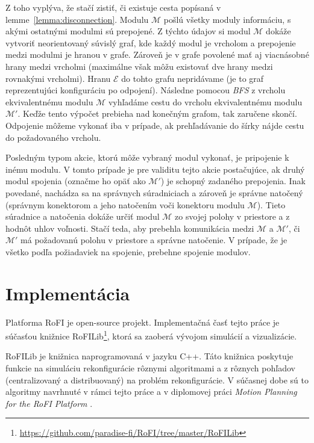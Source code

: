 \documentclass[
  digital, %
  oneside, %
  table,   %
  lof,     %
  nolot,     %
]{fithesis3}
\begin{document}
Z toho vyplýva, že stačí zistiť, či existuje cesta popísaná v lemme~\ref{lemma:disconnection}. Modulu $\mathcal{M}$ pošlú všetky moduly informáciu, s akými ostatnými modulmi sú prepojené. Z týchto údajov si modul $\mathcal{M}$ dokáže vytvoriť neorientovaný súvislý graf, kde každý modul je vrcholom a prepojenie medzi modulmi je hranou v grafe. Zároveň je v grafe povolené mať aj viacnásobné hrany medzi vrcholmi (maximálne však môžu existovať dve hrany medzi rovnakými vrcholmi). Hranu $\mathcal{E}$ do tohto grafu nepridávame (je to graf reprezentujúci konfiguráciu po odpojení). Následne pomocou \textit{BFS} z vrcholu ekvivalentnému modulu $\mathcal{M}$ vyhľadáme cestu do vrcholu ekvivalentnému modulu $\mathcal{M}'$. Keďže tento výpočet prebieha nad konečným grafom, tak zaručene skončí. Odpojenie môžeme vykonať iba v prípade, ak prehľadávanie do šírky nájde cestu do požadovaného vrcholu. 

Posledným typom akcie, ktorú môže vybraný modul vykonať, je pripojenie k inému modulu. V tomto prípade je pre validitu tejto akcie postačujúce, ak druhý modul spojenia (označme ho opäť ako $\mathcal{M}'$) je schopný zadaného prepojenia. Inak povedané, nachádza sa na správnych súradniciach a zároveň je správne natočený (správnym konektorom a jeho natočením voči konektoru modulu $\mathcal{M}$). Tieto súradnice a natočenia dokáže určiť modul $\mathcal{M}$ zo svojej polohy v priestore a z hodnôt uhlov voľnosti. Stačí teda, aby prebehla komunikácia medzi $\mathcal{M}$ a $\mathcal{M}'$, či $\mathcal{M}'$ má požadovanú polohu v priestore a správne natočenie. V prípade, že je všetko podľa požiadaviek na spojenie, prebehne spojenie modulov. 





\chapter{Implementácia}
\label{sec:implementation}
Platforma RoFI je open-source projekt. Implementačná časť tejto práce je súčasťou knižnice RoFILib\footnote{\url{https://github.com/paradise-fi/RoFI/tree/master/RoFILib}}, ktorá sa zaoberá vývojom simulácií a vizualizácie. 

RoFILib je knižnica naprogramovaná v jazyku C++. Táto knižnica poskytuje funkcie na simuláciu rekonfigurácie rôznymi algoritmami a z rôznych pohľadov (centralizovaný a distribuovaný) na problém rekonfigurácie. V súčasnej dobe sú to algoritmy navrhnuté v rámci tejto práce a v diplomovej práci \textit{Motion Planning for the RoFI Platform} \cite{vozarovaMasterThesis}.
\end{document}
